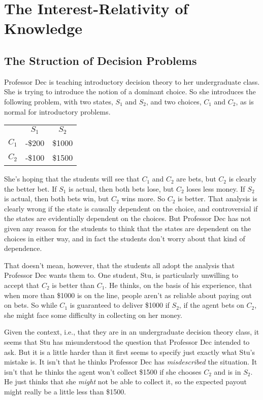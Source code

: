 \section{The Interest-Relativity of Knowledge}

\subsection{The Struction of Decision Problems}

Professor Dec is teaching introductory decision theory to her undergraduate class. She is trying to introduce the notion of a dominant choice. So she introduces the following problem, with two states, $S_1$ and $S_2$, and two choices, $C_1$ and $C_2$, as is normal for introductory problems.

\begin{center}
\begin{tabular}{r c c}
 & $S_1$ & $S_2$ \\
$C_1$ & -\$200 & \$1000 \\
$C_2$ & -\$100 & \$1500 
\end{tabular}
\end{center}

\noindent She's hoping that the students will see that $C_1$ and $C_2$ are bets, but $C_2$ is clearly the better bet. If $S_1$ is actual, then both bets lose, but $C_2$ loses less money. If $S_2$ is actual, then both bets win, but $C_2$ wins more. So $C_2$ is better. That analysis is clearly wrong if the state is causally dependent on the choice, and controversial if the states are evidentially dependent on the choices. But Professor Dec has not given any reason for the students to think that the states are dependent on the choices in either way, and in fact the students don't worry about that kind of dependence.

That doesn't mean, however, that the students all adopt the analysis that Professor Dec wants them to. One student, Stu, is particularly unwilling to accept that $C_2$ is better than $C_1$. He thinks, on the basis of his experience, that when more than \$1000 is on the line, people aren't as reliable about paying out on bets. So while $C_1$ is guaranteed to deliver \$1000 if $S_2$, if the agent bets on $C_2$, she might face some difficulty in collecting on her money.

Given the context, i.e., that they are in an undergraduate decision theory class, it seems that Stu has misunderstood the question that Professor Dec intended to ask. But it is a little harder than it first seems to specify just exactly what Stu's mistake is. It isn't that he thinks Professor Dec has \textit{misdescribed} the situation. It isn't that he thinks the agent won't collect \$1500 if she chooses $C_2$ and is in $S_2$. He just thinks that she \textit{might} not be able to collect it, so the expected payout might really be a little less than \$1500.

